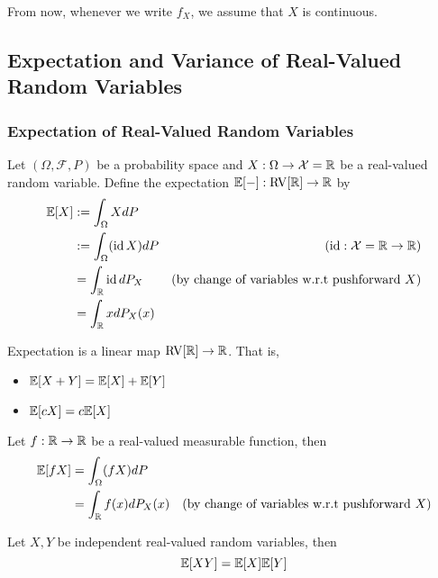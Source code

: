 \documentclass{report}
\begin{document}
From now, whenever we write $f_X$, we assume that $X$ is continuous.

\subsection{Expectation and Variance of Real-Valued Random Variables}

\subsubsection{Expectation of Real-Valued Random Variables}

\begin{definition}[expectation]
    Let $(\Omega, \mathcal{F}, P)$ be a probability space and $X: \Omega \to \mathcal{X} = \mathbb{R}$ be a real-valued random variable. Define the expectation $\mathbb{E}[-]: \operatorname{RV}[\mathbb{R}] \to \mathbb{R}$ by
    \begin{align*}
        \mathbb{E}[X]
        &:= \int_{\Omega} X dP \\
        &:= \int_{\Omega} (\operatorname{id} X) dP &\text{($\operatorname{id}: \mathcal{X} = \mathbb{R} \to \mathbb{R}$)} \\
        &= \int_{\mathbb{R}} \operatorname{id} dP_X &\text{(by change of variables w.r.t pushforward $X$)}\\
        &= \int_{\mathbb{R}} x dP_X(x)
    \end{align*}
\end{definition}

\begin{proposition}
    Expectation is a linear map $\operatorname{RV}[\mathbb{R}] \to \mathbb{R}$. That is,
    \begin{itemize}
        \item $\mathbb{E}[X + Y] = \mathbb{E}[X] + \mathbb{E}[Y]$
        \item $\mathbb{E}[cX] = c\mathbb{E}[X]$
    \end{itemize}
\end{proposition}

\begin{proposition}
    Let $f: \mathbb{R} \to \mathbb{R}$ be a real-valued measurable function, then
    \begin{align*}
        \mathbb{E}[f X]
        &= \int_{\Omega} (f X) dP \\
        &= \int_{\mathbb{R}} f(x) dP_X(x) &\text{(by change of variables w.r.t pushforward $X$)}
    \end{align*}
\end{proposition}

\begin{proposition}
    Let $X, Y$ be independent real-valued random variables, then
    $$
        \mathbb{E}[XY] = \mathbb{E}[X] \mathbb{E}[Y]
    $$
\end{proposition}
\end{document}
